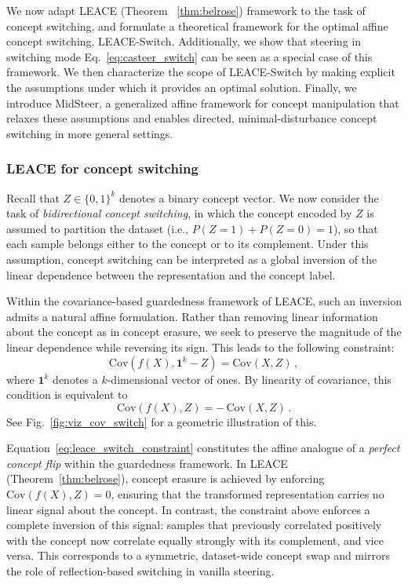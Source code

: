 \documentclass{article}
\theoremstyle{plain}
\theoremstyle{definition}
\theoremstyle{remark}
\newcommand{\cov}{\mathrm{Cov}}
\begin{document}
We now adapt LEACE (Theorem ~\ref{thm:belrose}) framework to the task of concept switching, and formulate a theoretical framework for the optimal affine concept switching, LEACE-Switch. Additionally, we show that steering in switching mode Eq.~\ref{eq:casteer_switch} can be seen as a special case of this framework. We then characterize the scope of LEACE-Switch by making explicit the assumptions under which it provides an optimal solution. Finally, we introduce MidSteer, a generalized affine framework for concept manipulation that relaxes these assumptions and enables directed, minimal-disturbance concept switching in more general settings.

\subsubsection{LEACE for concept switching}

Recall that $Z \in \{0,1\}^k$ denotes a binary concept vector. We now consider the task of \emph{bidirectional concept switching}, in which the concept encoded by $Z$ is assumed to partition the dataset (i.e., $P(Z=1)+P(Z=0)=1$), so that each sample belongs either to the concept or to its complement. Under this assumption, concept switching can be interpreted as a global inversion of the linear dependence between the representation and the concept label.

Within the covariance-based guardedness framework of LEACE, such an inversion admits a natural affine formulation. Rather than removing linear information about the concept as in concept erasure, we seek to preserve the magnitude of the linear dependence while reversing its sign. This leads to the following constraint:
\begin{equation}
    \cov(f(X), \mathbf{1}^k - Z) = \cov(X, Z) \, ,
\label{eq:leace_switch_constraint}
\end{equation}
where $\mathbf{1}^k$ denotes a $k$-dimensional vector of ones. By linearity of covariance, this condition is equivalent to
\begin{equation}
    \cov(f(X), Z) = -\,\cov(X, Z) \, .
\end{equation}
See Fig.~\ref{fig:viz_cov_switch} for a geometric illustration of this.

Equation~\ref{eq:leace_switch_constraint} constitutes the affine analogue of a \emph{perfect concept flip} within the guardedness framework. In LEACE (Theorem~\ref{thm:belrose}), concept erasure is achieved by enforcing $\cov(f(X), Z) = 0$, ensuring that the transformed representation carries no linear signal about the concept. In contrast, the constraint above enforces a complete inversion of this signal: samples that previously correlated positively with the concept now correlate equally strongly with its complement, and vice versa. This corresponds to a symmetric, dataset-wide concept swap and mirrors the role of reflection-based switching in vanilla steering.
\end{document}
